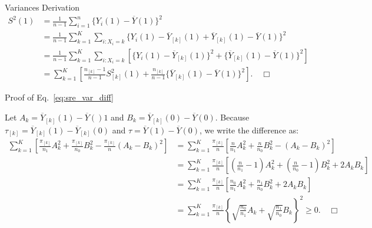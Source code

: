 \documentclass[aspectratio=169, 12pt]{beamer}
\begin{document}
\begin{frame}[label=pf-variances]{Variances Derivation}
  \small
    \begin{align*}
    S^2(1) 
    &= \frac{1}{n-1}\sum_{i=1}^{n}\{Y_i(1)-\overline{Y}(1)\}^2\\
    &= \frac{1}{n-1}\sum_{k=1}^{K}\sum_{i:X_i=k}^{}\{Y_i(1)-\overline{Y}_{[k]}(1)+\overline{Y}_{[k]}(1)-\overline{Y}(1)\}^2\\
    &= \frac{1}{n-1}\sum_{k=1}^{K}\sum_{i:X_i=k}^{}[\{Y_i(1)-\overline{Y}_{[k]}(1)\}^2+\{\overline{Y}_{[k]}(1)-\overline{Y}(1)\}^2]\\
    &= \sum_{k=1}^{K}\left[
      \frac{n_{[k]}-1}{n-1}S_{[k]}^2(1)+\frac{n_{[k]}}{n-1}\{\overline{Y}_{[k]}(1)-\overline{Y}(1)\}^2
    \right]. \quad \Box
  \end{align*}
  \vfill
  \hfill\hyperlink{variances<1>}{}
\end{frame}

\begin{frame}[label=pf-sre_var_diff]{Proof of Eq.~\eqref{eq:sre_var_diff}}

  { \footnotesize
    Let $A_k=\overline{Y}_{[k]}(1)-\overline{Y}()1$ and $B_k=\overline{Y}_{[k]}(0)-\overline{Y}(0)$. Because $\tau_{[k]}=\overline{Y}_{[k]}(1)-\overline{Y}_{[k]}(0)$ and $\tau=\overline{Y}(1)-\overline{Y}(0)$, we write the difference as:
    \begin{align*}
      \sum_{k=1}^{K}\left[\frac{\pi_{[k]}}{n_1}A_k^2+\frac{\pi_{[k]}}{n_0}B_k^2-\frac{\pi_{[k]}}{n}(A_k-B_k)^2\right]
      &= \sum_{k=1}^{K}\frac{\pi_{[k]}}{n}\left[\frac{n}{n_1}A_k^2+\frac{n}{n_0}B_k^2-(A_k-B_k)^2\right]\\
      &= \sum_{k=1}^{K}\frac{\pi_{[k]}}{n}\left[\left(\frac{n}{n_1}-1\right)A_k^2+\left(\frac{n}{n_0}-1\right)B_k^2+2A_kB_k\right]\\
      &= \sum_{k=1}^{K}\frac{\pi_{[k]}}{n}\left[\frac{n_0}{n_1}A_k^2+\frac{n_1}{n_0}B_k^2+2A_kB_k\right]\\
      &= \sum_{k=1}^{K}\frac{\pi_{[k]}}{n}\left\{\sqrt{\frac{n_0}{n_1}}A_k+\sqrt{\frac{n_1}{n_0}}B_k\right\}^2 \geq 0. \quad \Box
    \end{align*}
  }
  \vfill
  \hfill\hyperlink{sre_var_diff<1>}{}
  
\end{frame}
\end{document}
